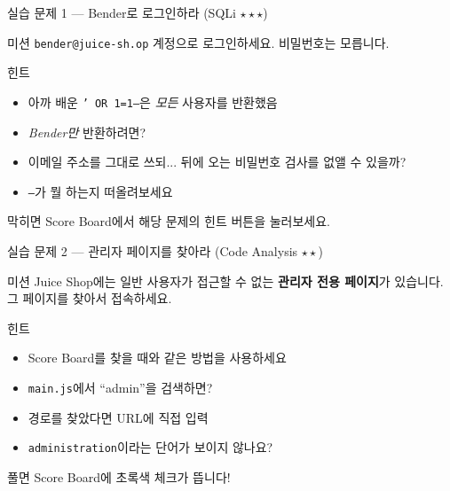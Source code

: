 \documentclass[aspectratio=169,10pt]{beamer}
\begin{document}
\begin{frame}{실습 문제 1 — Bender로 로그인하라 (SQLi $\star\star\star$)}

\begin{block}{미션}
\texttt{bender@juice-sh.op} 계정으로 로그인하세요. 비밀번호는 모릅니다.
\end{block}

\vspace{0.3em}
\begin{block}{힌트}
\begin{itemize}
    \item 아까 배운 \texttt{' OR 1=1--}은 \textit{모든} 사용자를 반환했음
    \item \textit{Bender만} 반환하려면?
    \item 이메일 주소를 그대로 쓰되... 뒤에 오는 비밀번호 검사를 없앨 수 있을까?
    \item \texttt{--}가 뭘 하는지 떠올려보세요
\end{itemize}
\end{block}

\vspace{0.3em}
{\footnotesize 막히면 Score Board에서 해당 문제의 힌트 버튼을 눌러보세요.}
\end{frame}

\begin{frame}{실습 문제 2 — 관리자 페이지를 찾아라 (Code Analysis $\star\star$)}

\begin{block}{미션}
Juice Shop에는 일반 사용자가 접근할 수 없는 \textbf{관리자 전용 페이지}가 있습니다.\\
그 페이지를 찾아서 접속하세요.
\end{block}

\vspace{0.3em}
\begin{block}{힌트}
\begin{itemize}
    \item Score Board를 찾을 때와 같은 방법을 사용하세요
    \item \texttt{main.js}에서 ``admin''을 검색하면?
    \item 경로를 찾았다면 URL에 직접 입력
    \item \texttt{administration}이라는 단어가 보이지 않나요?
\end{itemize}
\end{block}

\vspace{0.3em}
{\footnotesize 풀면 Score Board에 초록색 체크가 뜹니다!}
\end{frame}
\end{document}
